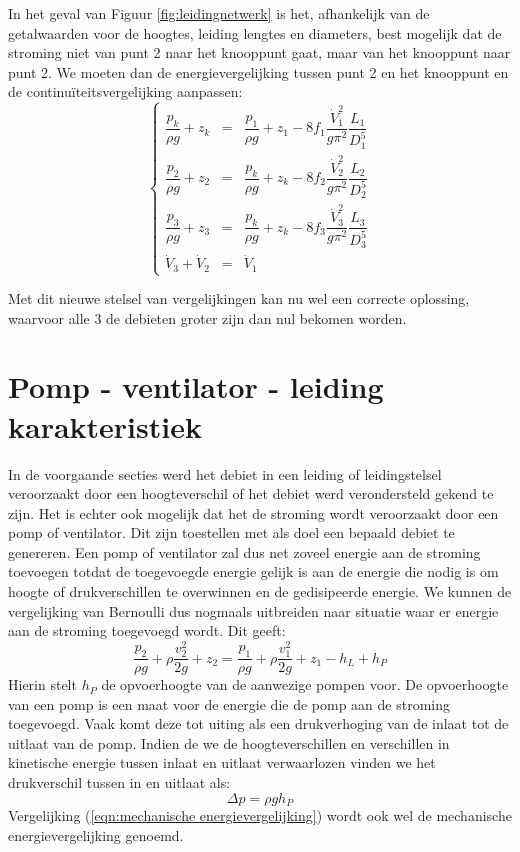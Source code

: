 In het geval van Figuur \ref{fig:leidingnetwerk} is het, afhankelijk van de getalwaarden voor de hoogtes, leiding lengtes en diameters, best mogelijk dat de stroming niet van punt 2 naar het knooppunt gaat, maar van het knooppunt naar punt 2. We moeten dan de energievergelijking tussen punt 2 en het knooppunt en de continuïteitsvergelijking aanpassen:
			\begin{equation}
				\left\{
				\begin{array}{lcl}
					\dfrac{p_k}{\rho g} + z_k &=& \dfrac{p_1}{\rho g} + z_1 - 8 f_1 \dfrac{\dot{V}_1^2}{g \pi^2} \dfrac{L_1}{D_1^5} \\
					\dfrac{p_2}{\rho g} + z_2 &=& \dfrac{p_k}{\rho g} + z_k - 8 f_2 \dfrac{\dot{V}_2^2}{g \pi^2} \dfrac{L_2}{D_2^5} \\
					\dfrac{p_3}{\rho g} + z_3 &=& \dfrac{p_k}{\rho g} + z_k - 8 f_3 \dfrac{\dot{V}_3^2}{g \pi^2} \dfrac{L_3}{D_3^5} \\
					\dot{V}_3 + \dot{V}_2 &=& \dot{V}_1 
				\end{array}
				\right.
				\label{eqn:3reservoirs stelsel2}
			\end{equation}

Met dit nieuwe stelsel van vergelijkingen kan nu wel een correcte oplossing, waarvoor alle 3 de debieten groter zijn dan nul bekomen worden.


	\section{Pomp - ventilator - leiding karakteristiek}
	\label{sec:Pomp - ventilator - leiding karakteristiek}
In de voorgaande secties werd het debiet in een leiding of leidingstelsel veroorzaakt door een hoogteverschil of het debiet werd verondersteld gekend te zijn. Het is echter ook mogelijk dat het de stroming wordt veroorzaakt door een pomp of ventilator. Dit zijn toestellen met als doel een bepaald debiet te genereren. Een pomp of ventilator zal dus net zoveel energie aan de stroming toevoegen totdat de toegevoegde energie gelijk is aan de energie die nodig is om hoogte of drukverschillen te overwinnen en de gedisipeerde energie. We kunnen de vergelijking van Bernoulli dus nogmaals uitbreiden naar situatie waar er energie aan de stroming toegevoegd wordt. Dit geeft: 
\begin{equation}
	\frac{p_2}{\rho g} + \rho \frac{v_2^2}{2 g}  + z_2 = \frac{p_1}{\rho g} + \rho \frac{v_1^2}{2 g}  + z_1 - h_L + h_P
	\label{eqn:mechanische energievergelijking}
\end{equation}
Hierin stelt $h_P$ de opvoerhoogte van de aanwezige pompen voor. De opvoerhoogte van een pomp is een maat voor de energie die de pomp aan de stroming toegevoegd. Vaak komt deze tot uiting als een drukverhoging van de inlaat tot de uitlaat van de pomp. Indien de we de hoogteverschillen en verschillen in kinetische energie tussen inlaat en uitlaat verwaarlozen vinden we het drukverschil tussen in en uitlaat als:
\begin{equation}
	\Delta p = \rho g h_P
\end{equation}
Vergelijking (\ref{eqn:mechanische energievergelijking}) wordt ook wel de mechanische energievergelijking genoemd.

